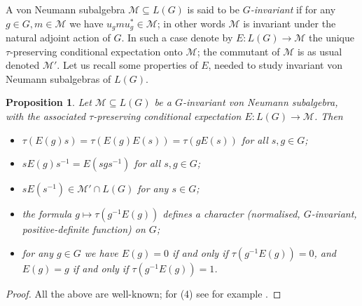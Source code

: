 \documentclass[11pt]{amsart}
\theoremstyle{plain}
\newtheorem{proposition}[theorem]{Proposition}
\theoremstyle{definition}
\theoremstyle{remark}
\numberwithin{equation}{section}
\begin{document}
A von Neumann subalgebra $\mathcal M\subseteq L(G)$ is said to be \emph{$G$-invariant} if for any $g \in G, m \in \mathcal{M}$ we have $u_g m u_g^* \in \mathcal{M}$; in other words $\mathcal{M}$ is invariant under the natural adjoint action of $G$. In such a case denote by $E: L(G)\rightarrow \mathcal M$ the unique $\tau$-preserving conditional expectation onto $\mathcal{M}$; the commutant of $\mathcal{M}$ is as usual denoted $\mathcal{M}'$. Let us recall some properties of $E$, needed to study invariant von Neumann subalgebras of $L(G)$. 
\begin{proposition}\label{prop: E properties}
	Let $\mathcal M\subseteq L(G)$ be a $G$-invariant von Neumann subalgebra, with the associated $\tau$-preserving conditional expectation $E: L(G)\rightarrow \mathcal M$. Then
	\begin{itemize}
		\item[(1)] $\tau(E(g)s)=\tau(E(g)E(s))=\tau(gE(s))$ for all $s, g\in G$;
		\item[(2)] $sE(g)s^{-1}=E(sgs^{-1})$ for all $s, g\in G$;
		\item[(3)] $sE(s^{-1})\in\mathcal M'\cap L(G)$ for any $s\in G$;
		\item[(4)] the formula $g \mapsto \tau(g^{-1}E(g))$ defines a character (normalised, $G$-invariant, positive-definite function) on $G$;
		\item[(5)] for any $g \in G$ we have $E(g)=0$ if and only if $\tau(g^{-1}E(g))=0$, and $E(g) = g$ if and only if $\tau(g^{-1}E(g))=1$.
	\end{itemize}
\end{proposition}
\begin{proof}
	All the above are well-known; for (4) see for example \cite[Proposition 3.2]{jz}.
\end{proof}
\end{document}
